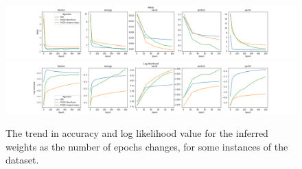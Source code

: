 \begin{figure}[h]
    \centering
    \includegraphics[width=\textwidth]{figs/bayesian_epoch_RMSE.png}
    \newline
    \includegraphics[width=\textwidth]{figs/bayesian_epoch_Loglikelihood.png}
    \caption{The trend in accuracy and log likelihood value for the inferred weights as the number of epochs changes, for some instances of the dataset.}
    \label{fig:bnn-epoch}
\end{figure}